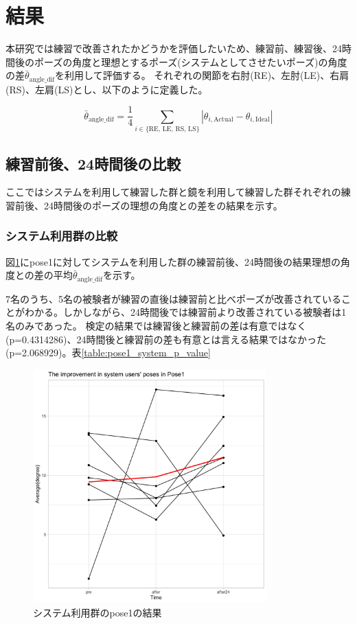 \section{結果}
本研究では練習で改善されたかどうかを評価したいため、練習前、練習後、24時間後のポーズの角度と理想とするポーズ(システムとしてさせたいポーズ)の角度の差\(\bar{\theta}_{\text{angle\_dif}}\)を利用して評価する。
それぞれの関節を右肘(RE)、左肘(LE)、右肩(RS)、左肩(LS)とし、以下のように定義した。

\[
  \bar{\theta}_{\text{angle\_dif}} = \frac{1}{4} \sum_{i \in \{\text{RE, LE, RS, LS}\}} |\theta_{i, \text{Actual}} - \theta_{i, \text{Ideal}}|
\]

\subsection{練習前後、24時間後の比較}
ここではシステムを利用して練習した群と鏡を利用して練習した群それぞれの練習前後、24時間後のポーズの理想の角度との差をの結果を示す。
\subsubsection{システム利用群の比較}
図\ref{fig:pose1_system}にpose1に対してシステムを利用した群の練習前後、24時間後の結果理想の角度との差の平均\(\bar{\theta}_{\text{angle\_dif}}\)を示す。


7名のうち、5名の被験者が練習の直後は練習前と比べポーズが改善されていることがわかる。しかしながら、24時間後では練習前より改善されている被験者は1名のみであった。
検定の結果では練習後と練習前の差は有意ではなく(p=0.4314286)、24時間後と練習前の差も有意とは言える結果ではなかった(p=2.068929)。表\ref{table:pose1_system_p_value}

\begin{figure}[H]
  \begin{center}
  \includegraphics[width=9cm]{figures/pose1_system_true_graph.png}
  \caption{システム利用群のpose1の結果}
  \label{fig:pose1_system}
  \end{center}
\end{figure}

